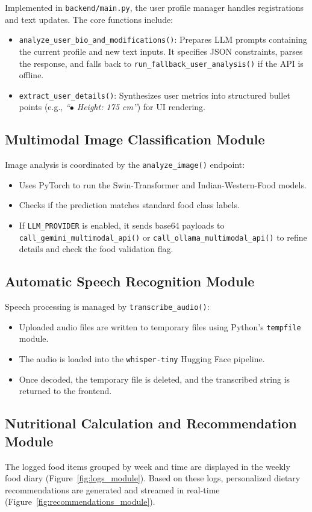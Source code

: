 \documentclass[12pt,a4paper,oneside]{report}
\begin{document}
Implemented in \texttt{backend/main.py}, the user profile manager handles registrations and text updates. The core functions include:
\begin{itemize}
    \item \texttt{analyze\_user\_bio\_and\_modifications()}: Prepares LLM prompts containing the current profile and new text inputs. It specifies JSON constraints, parses the response, and falls back to \texttt{run\_fallback\_user\_analysis()} if the API is offline.
    \item \texttt{extract\_user\_details()}: Synthesizes user metrics into structured bullet points (e.g., \textit{``$\bullet$ Height: 175 cm''}) for UI rendering.
\end{itemize}

\subsection{Multimodal Image Classification Module}
Image analysis is coordinated by the \texttt{analyze\_image()} endpoint:
\begin{itemize}
    \item Uses PyTorch to run the Swin-Transformer and Indian-Western-Food models.
    \item Checks if the prediction matches standard food class labels.
    \item If \texttt{LLM\_PROVIDER} is enabled, it sends base64 payloads to \texttt{call\_gemini\_multimodal\_api()} or \texttt{call\_ollama\_multimodal\_api()} to refine details and check the food validation flag.
\end{itemize}

\subsection{Automatic Speech Recognition Module}
Speech processing is managed by \texttt{transcribe\_audio()}:
\begin{itemize}
    \item Uploaded audio files are written to temporary files using Python's \texttt{tempfile} module.
    \item The audio is loaded into the \texttt{whisper-tiny} Hugging Face pipeline.
    \item Once decoded, the temporary file is deleted, and the transcribed string is returned to the frontend.
\end{itemize}

\subsection{Nutritional Calculation and Recommendation Module}
The logged food items grouped by week and time are displayed in the weekly food diary (Figure~\ref{fig:logs_module}). Based on these logs, personalized dietary recommendations are generated and streamed in real-time (Figure~\ref{fig:recommendations_module}).
\end{document}
